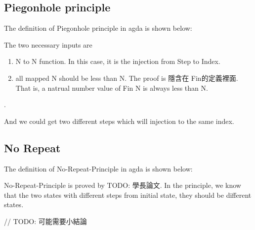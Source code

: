 \subsection{ Piegonhole principle }
The definition of Piegonhole principle in agda is shown below:



The two necessary inputs are 
\begin{enumerate}[1.]
    \item N to N function. In this case, it is the injection from Step to Index. 
    \item all mapped N should be less than N.  The proof is 隱含在 Fin的定義裡面.  That is, a natrual number value of Fin N is always less than N.
\end{enumerate}.

And we could get two different steps which will injection to the same index.

\subsection{ No Repeat }
The definition of No-Repeat-Principle in agda is shown below:

No-Repeat-Principle is proved by {TODO: 學長論文}.  In the principle, we know that the two states with different steps from initial state, they should be different states.


// TODO: 可能需要小結論

